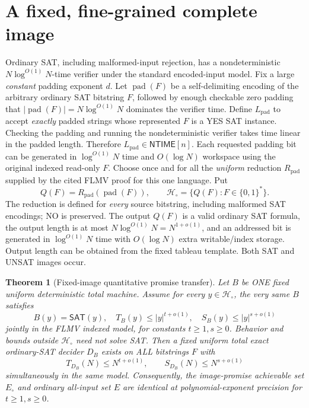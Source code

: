 \documentclass[11pt]{article}
\newtheorem{theorem}{Theorem}
\newcommand{\SAT}{\mathsf{SAT}}
\newcommand{\NTIME}{\mathsf{NTIME}}
\begin{document}
\section{A fixed, fine-grained complete image}
Ordinary SAT, including malformed-input rejection, has a nondeterministic \(N\log^{O(1)}N\)-time verifier under the standard encoded-input model. Fix a large \emph{constant} padding exponent \(d\). Let \(\operatorname{pad}(F)\) be a self-delimiting encoding of the arbitrary ordinary SAT bitstring \(F\), followed by enough checkable zero padding that \(|\operatorname{pad}(F)|=N\log^{O(1)}N\) dominates the verifier time. Define \(L_{\mathrm{pad}}\) to accept \emph{exactly} padded strings whose represented \(F\) is a YES SAT instance. Checking the padding and running the nondeterministic verifier takes time linear in the padded length. Therefore \(L_{\mathrm{pad}}\in\NTIME[n]\). Each requested padding bit can be generated in \(\log^{O(1)}N\) time and \(O(\log N)\) workspace using the original indexed read-only \(F\).
Choose once and for all the \emph{uniform} reduction \(R_{\mathrm{pad}}\) supplied by the cited FLMV proof for this one language. Put
\[
Q(F)=R_{\mathrm{pad}}(\operatorname{pad}(F)),\qquad
\mathcal H_\circ=\{Q(F):F\in\{0,1\}^{*}\}.
\]
The reduction is defined for \emph{every} source bitstring, including malformed SAT encodings; NO is preserved. The output \(Q(F)\) is a valid ordinary SAT formula, the output length is at most \(N\log^{O(1)}N=N^{1+o(1)}\), and an addressed bit is generated in \(\log^{O(1)}N\) time with \(O(\log N)\) extra writable/index storage. Output length can be obtained from the fixed tableau template. Both SAT and UNSAT images occur.
\begin{theorem}[Fixed-image quantitative promise transfer]\label{th:transfer}
Let \(B\) be ONE fixed uniform deterministic total machine. Assume for \emph{every} \(y\in\mathcal H_\circ\), the very same \(B\) satisfies
\[
B(y)=\SAT(y),\quad
T_B(y)\le |y|^{t+o(1)},\quad
S_B(y)\le |y|^{s+o(1)}
\]
jointly in the FLMV indexed model, for constants \(t\ge1,s\ge0\). Behavior and bounds \emph{outside} \(\mathcal H_\circ\) need not solve SAT. Then a fixed uniform total exact ordinary-SAT decider \(D_B\) exists on ALL bitstrings \(F\) with
\[
T_{D_B}(N)\le N^{t+o(1)},\qquad
S_{D_B}(N)\le N^{s+o(1)}
\]
simultaneously in the same model. Consequently, the image-promise achievable set \(E_\circ\) and ordinary all-input set \(E\) are identical at polynomial-exponent precision for \(t\ge1,s\ge0\).
\end{theorem}
\end{document}
